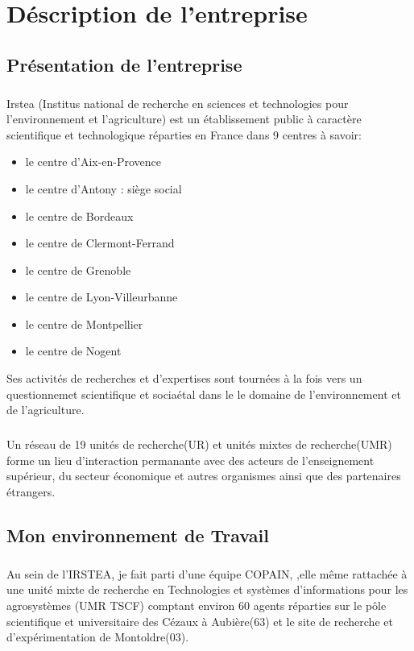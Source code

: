 \chapter{Déscription de l'entreprise}
\section{Présentation de l'entreprise}
\paragraph{}
Irstea (Institus national de recherche en sciences et technologies pour l'environnement et l'agriculture) est un établissement public à caractère scientifique  et technologique réparties en France dans 9 centres à savoir:  
\begin{itemize}
 \item le centre d'Aix-en-Provence
 \item le centre d'Antony : siège social
 \item le centre de Bordeaux
 \item le centre de Clermont-Ferrand
 \item le centre de Grenoble
 \item le centre de Lyon-Villeurbanne
 \item le centre de Montpellier
 \item le centre de Nogent
\end{itemize}

Ses activités de recherches et d'expertises sont tournées à la fois vers un questionnemet scientifique et sociaétal dans le le domaine de l'environnement et de l'agriculture. 

\paragraph{}
Un réseau de 19 unités de recherche(UR) et unités mixtes de recherche(UMR) forme un lieu d'interaction permanante avec des acteurs de l'enseignement supérieur, du secteur économique et autres organismes ainsi que des partenaires étrangers.

\section{Mon environnement de Travail}
\paragraph{}
Au sein de l'IRSTEA, je fait parti d'une équipe COPAIN, ,elle même rattachée à une unité mixte de recherche en Technologies et systèmes d'informations pour les agrosystèmes (UMR TSCF) comptant environ 60 agents  réparties sur le pôle scientifique et universitaire des Cézaux à Aubière(63) et le site de recherche et d'expérimentation de Montoldre(03).
